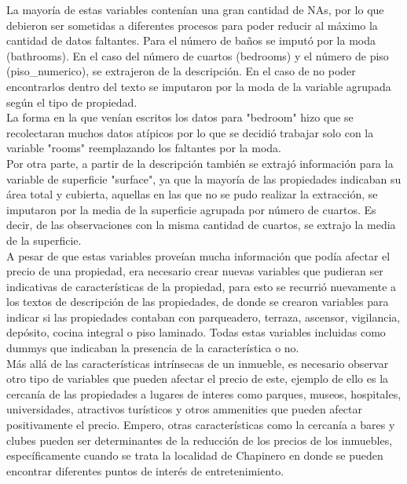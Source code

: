 \documentclass[12pt]{article}
\begin{document}
La mayoría de estas variables contenían una gran cantidad de NAs, por lo que debieron ser sometidas a diferentes procesos para poder reducir al máximo la cantidad de datos faltantes. Para el número de baños se imputó por la moda (bathrooms). En el caso del número de cuartos (bedrooms) y el número de piso (piso\_numerico), se extrajeron de la  descripción. En el caso de no poder encontrarlos dentro del texto se imputaron por la moda de la variable agrupada según el tipo de propiedad.\\ 

La forma en la que venían escritos los datos para "bedroom" hizo que se recolectaran muchos datos atípicos por lo que se decidió trabajar solo con la variable "rooms" reemplazando los faltantes por la moda. \\

Por otra parte, a partir de la descripción también se extrajó información para la variable de superficie "surface", ya que la mayoría de las propiedades indicaban su área total y cubierta, aquellas en las que no se pudo realizar la extracción, se imputaron por la media de la superficie agrupada por número de cuartos. Es decir, de las observaciones con la misma cantidad de cuartos, se extrajo la media de la superficie.\\

A pesar de que estas variables proveían mucha información que podía afectar el precio de una propiedad, era necesario crear nuevas variables que pudieran ser indicativas de características de la propiedad, para esto se recurrió nuevamente a los textos de descripción de las propiedades, de donde se crearon
variables para indicar si las propiedades contaban con parqueadero, terraza, ascensor, vigilancia, depósito, cocina integral o piso laminado. Todas estas variables incluidas como dummys que indicaban la presencia de la característica o no.\\

Más allá de las características intrínsecas de un inmueble, es necesario observar otro tipo de variables que pueden afectar el precio de este, ejemplo de ello es la cercanía de las propiedades a lugares de interes como parques, museos, hospitales, universidades, atractivos turísticos y otros ammenities que pueden afectar positivamente el precio. Empero, otras características como la cercanía  a bares y clubes pueden ser determinantes de la reducción de los precios de los inmuebles, específicamente cuando se trata la localidad de Chapinero en donde se pueden encontrar diferentes puntos de interés de entretenimiento.\\
\end{document}
